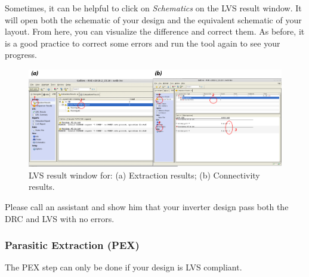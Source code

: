 \begin{remark}
	Sometimes, it can be helpful to click on \textit{Schematics} on the LVS result window. It will open both the schematic of your design and the equivalent schematic of your layout. From here, you can visualize the difference and correct them. \newline
	As before, it is a good practice to correct some errors and run the tool again to see your progress.
\end{remark}

\begin{figure}[!h]
	\centering
	\includegraphics[scale=0.28]{figures/lab2_layout/bad_lvs}
	\caption{LVS result window for: (a) Extraction results; (b) Connectivity results.}
	\label{fig_lvs_bad}
\end{figure}


\begin{checkpoint}\label{check1}
	Please call an assistant and show him that your inverter design pass both the DRC and LVS with no errors.
\end{checkpoint}

\newpage 
\subsubsection{Parasitic Extraction (PEX)}
\begin{warning}
	The PEX step can only be done if your design is LVS compliant.
\end{warning}



